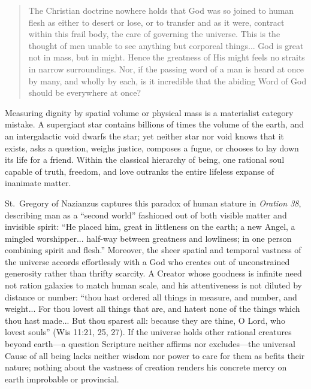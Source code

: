 \begin{quote}
The Christian doctrine nowhere holds that God was so joined to human flesh as either to desert or lose, or to transfer and as it were, contract within this frail body, the care of governing the universe. This is the thought of men unable to see anything but corporeal things... God is great not in mass, but in might. Hence the greatness of His might feels no straits in narrow surroundings. Nor, if the passing word of a man is heard at once by many, and wholly by each, is it incredible that the abiding Word of God should be everywhere at once?
\end{quote}

Measuring dignity by spatial volume or physical mass is a materialist category mistake. A supergiant star contains billions of times the volume of the earth, and an intergalactic void dwarfs the star; yet neither star nor void knows that it exists, asks a question, weighs justice, composes a fugue, or chooses to lay down its life for a friend. Within the classical hierarchy of being, one rational soul capable of truth, freedom, and love outranks the entire lifeless expanse of inanimate matter.

St.\ Gregory of Nazianzus captures this paradox of human stature in \textit{Oration 38}, describing man as a ``second world'' fashioned out of both visible matter and invisible spirit: ``He placed him, great in littleness on the earth; a new Angel, a mingled worshipper... half-way between greatness and lowliness; in one person combining spirit and flesh.'' Moreover, the sheer spatial and temporal vastness of the universe accords effortlessly with a God who creates out of unconstrained generosity rather than thrifty scarcity. A Creator whose goodness is infinite need not ration galaxies to match human scale, and his attentiveness is not diluted by distance or number: ``thou hast ordered all things in measure, and number, and weight... For thou lovest all things that are, and hatest none of the things which thou hast made... But thou sparest all: because they are thine, O Lord, who lovest souls'' (Wis 11:21, 25, 27). If the universe holds other rational creatures beyond earth---a question Scripture neither affirms nor excludes---the universal Cause of all being lacks neither wisdom nor power to care for them as befits their nature; nothing about the vastness of creation renders his concrete mercy on earth improbable or provincial.


